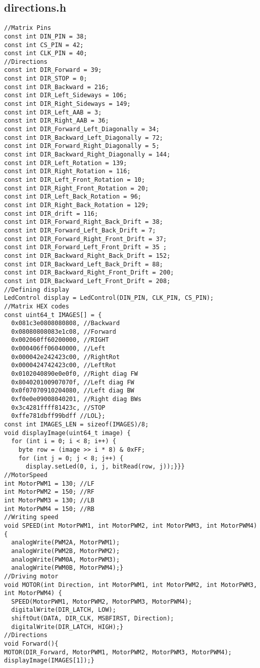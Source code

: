 \subsection{directions.h}
\begin{lstlisting}
//Matrix Pins
const int DIN_PIN = 38;
const int CS_PIN = 42;
const int CLK_PIN = 40;
//Directions
const int DIR_Forward = 39; 
const int DIR_STOP = 0;
const int DIR_Backward = 216;
const int DIR_Left_Sideways = 106;
const int DIR_Right_Sideways = 149;
const int DIR_Left_AAB = 3;
const int DIR_Right_AAB = 36;
const int DIR_Forward_Left_Diagonally = 34;
const int DIR_Backward_Left_Diagonally = 72;
const int DIR_Forward_Right_Diagonally = 5;
const int DIR_Backward_Right_Diagonally = 144;
const int DIR_Left_Rotation = 139;
const int DIR_Right_Rotation = 116;
const int DIR_Left_Front_Rotation = 10;
const int DIR_Right_Front_Rotation = 20;
const int DIR_Left_Back_Rotation = 96;
const int DIR_Right_Back_Rotation = 129;
const int DIR_drift = 116;
const int DIR_Forward_Right_Back_Drift = 38;
const int DIR_Forward_Left_Back_Drift = 7;
const int DIR_Forward_Right_Front_Drift = 37;
const int DIR_Forward_Left_Front_Drift = 35 ;
const int DIR_Backward_Right_Back_Drift = 152;
const int DIR_Backward_Left_Back_Drift = 88;
const int DIR_Backward_Right_Front_Drift = 200;
const int DIR_Backward_Left_Front_Drift = 208;
//Defining display
LedControl display = LedControl(DIN_PIN, CLK_PIN, CS_PIN);
//Matrix HEX codes
const uint64_t IMAGES[] = {
  0x081c3e0808080808, //Backward
  0x08080808083e1c08, //Forward
  0x002060ff60200000, //RIGHT
  0x000406ff06040000, //Left
  0x000042e242423c00, //RightRot
  0x0000424742423c00, //LeftRot
  0x0102040890e0e0f0, //Right diag FW
  0x804020100907070f, //Left diag FW
  0x0f07070910204080, //Left diag BW
  0xf0e0e09008040201, //Right diag BWs
  0x3c4281ffff81423c, //STOP
  0xffe781dbff99bdff //LOL};
const int IMAGES_LEN = sizeof(IMAGES)/8;
void displayImage(uint64_t image) {
  for (int i = 0; i < 8; i++) {
    byte row = (image >> i * 8) & 0xFF;
    for (int j = 0; j < 8; j++) {
      display.setLed(0, i, j, bitRead(row, j));}}}
//MotorSpeed
int MotorPWM1 = 130; //LF
int MotorPWM2 = 150; //RF
int MotorPWM3 = 130; //LB
int MotorPWM4 = 150; //RB
//Writing speed
void SPEED(int MotorPWM1, int MotorPWM2, int MotorPWM3, int MotorPWM4){
  analogWrite(PWM2A, MotorPWM1);
  analogWrite(PWM2B, MotorPWM2);
  analogWrite(PWM0A, MotorPWM3);
  analogWrite(PWM0B, MotorPWM4);}
//Driving motor
void MOTOR(int Direction, int MotorPWM1, int MotorPWM2, int MotorPWM3, int MotorPWM4) {
  SPEED(MotorPWM1, MotorPWM2, MotorPWM3, MotorPWM4);
  digitalWrite(DIR_LATCH, LOW);
  shiftOut(DATA, DIR_CLK, MSBFIRST, Direction);
  digitalWrite(DIR_LATCH, HIGH);}
//Directions
void Forward(){
MOTOR(DIR_Forward, MotorPWM1, MotorPWM2, MotorPWM3, MotorPWM4);
displayImage(IMAGES[1]);}


\end{lstlisting}
